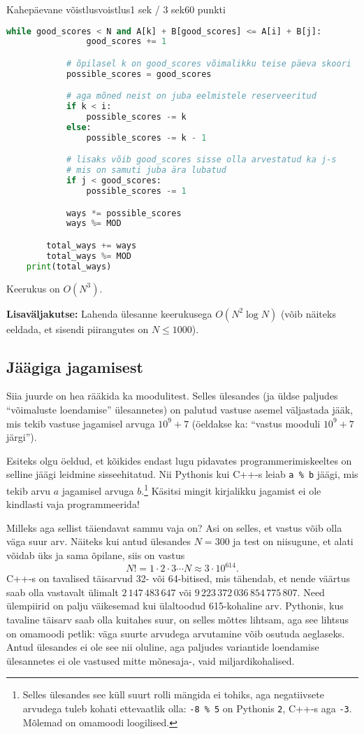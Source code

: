 \begin{yl}{4}{Kahepäevane võistlus}{voistlus}{1 sek / 3 sek}{60 punkti}
\begin{lstlisting}[language=Python]
            while good_scores < N and A[k] + B[good_scores] <= A[i] + B[j]:
                good_scores += 1

            # õpilasel k on good_scores võimalikku teise päeva skoori
            possible_scores = good_scores

            # aga mõned neist on juba eelmistele reserveeritud
            if k < i:
                possible_scores -= k
            else:
                possible_scores -= k - 1

            # lisaks võib good_scores sisse olla arvestatud ka j-s
            # mis on samuti juba ära lubatud
            if j < good_scores:
                possible_scores -= 1

            ways *= possible_scores
            ways %= MOD

        total_ways += ways
        total_ways %= MOD
    print(total_ways)
  \end{lstlisting}

  Keerukus on $O(N^3)$.

  \textbf{Lisaväljakutse:}
  Lahenda ülesanne keerukusega $O(N^2 \log N)$ (võib näiteks eeldada, et sisendi
  piirangutes on $N \le 1000$).

  \subsection*{Jäägiga jagamisest}

  Siia juurde on hea rääkida ka moodulitest. Selles ülesandes (ja üldse paljudes
  ``võimaluste loendamise'' ülesannetes) on palutud vastuse asemel väljastada
  jääk, mis tekib vastuse jagamisel arvuga $10^9 + 7$ (öeldakse ka: ``vastus
  mooduli $10^9 + 7$ järgi'').

  Esiteks olgu öeldud, et kõikides endast lugu pidavates programmerimiskeeltes
  on selline jäägi leidmine sisseehitatud. Nii Pythonis kui C++-s leiab
  \texttt{a \% b} jäägi, mis tekib arvu $a$ jagamisel arvuga $b$.\footnote{Selles
    ülesandes see küll suurt rolli mängida ei tohiks, aga
    negatiivsete arvudega tuleb kohati ettevaatlik olla: \texttt{-8 \% 5} on
    Pythonis \texttt{2}, C++-s aga \texttt{-3}. Mõlemad on omamoodi loogilised.}
  Käsitsi mingit kirjalikku jagamist ei ole kindlasti vaja programmeerida!

  Milleks aga sellist täiendavat sammu vaja on?
  Asi on selles, et vastus võib olla väga suur arv. Näiteks kui antud ülesandes
  $N = 300$ ja test on niisugune, et alati võidab üks ja sama õpilane, siis on
  vastus
  \[ N! = 1 \cdot 2 \cdot 3 \cdots N \approx 3 \cdot 10^{614}. \]
  C++-s on tavalised täisarvud 32- või 64-bitised, mis tähendab, et nende
  väärtus saab olla vastavalt ülimalt $2\,147\,483\,647$ või $9\,223\,372\,036\,854\,775\,807$.
  Need ülempiirid on palju väikesemad kui ülaltoodud 615-kohaline arv.
  Pythonis, kus tavaline täisarv saab olla kuitahes suur, on selles mõttes
  lihtsam, aga see lihtsus on omamoodi petlik: väga suurte arvudega arvutamine
  võib osutuda aeglaseks. Antud ülesandes ei ole see nii oluline, aga paljudes
  variantide loendamise ülesannetes ei ole vastused mitte mõnesaja-, vaid miljardikohalised.


\end{yl}

